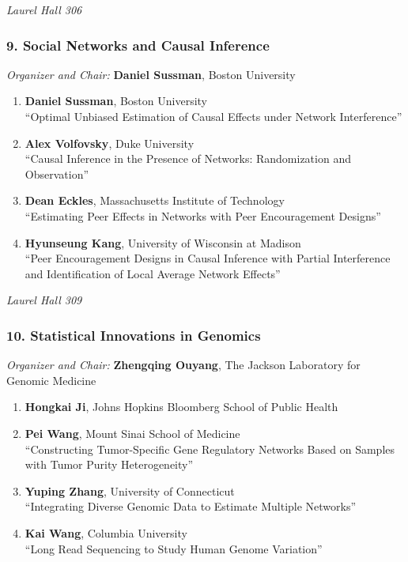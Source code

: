 \emph{Laurel Hall 306} \\[.5em]

\subsubsection*{9. Social Networks and Causal Inference}

\emph{Organizer and Chair:} \textbf{Daniel Sussman}, Boston University

\begin{enumerate}
\item \textbf{Daniel Sussman}, Boston University \\
``Optimal Unbiased Estimation of Causal Effects under Network Interference''
\item \textbf{Alex Volfovsky}, Duke University \\
``Causal Inference in the Presence of Networks: Randomization and Observation''
\item \textbf{Dean Eckles}, Massachusetts Institute of Technology \\
``Estimating Peer Effects in Networks with Peer Encouragement Designs''
\item \textbf{Hyunseung Kang}, University of Wisconsin at Madison \\
``Peer Encouragement Designs in Causal Inference with Partial Interference and Identification of Local Average Network Effects''
\end{enumerate}

\emph{Laurel Hall 309} \\[.5em]

\subsubsection*{10. Statistical Innovations in Genomics}

\emph{Organizer and Chair:} \textbf{Zhengqing Ouyang}, The Jackson Laboratory for Genomic Medicine

\begin{enumerate}
\item \textbf{Hongkai Ji}, Johns Hopkins Bloomberg School of Public Health 
\item \textbf{Pei Wang}, Mount Sinai School of Medicine \\
``Constructing Tumor-Specific Gene Regulatory Networks Based on Samples with Tumor Purity Heterogeneity''
\item \textbf{Yuping Zhang}, University of Connecticut \\
``Integrating Diverse Genomic Data to Estimate Multiple Networks''
\item \textbf{Kai Wang}, Columbia University \\
``Long Read Sequencing to Study Human Genome Variation''
\end{enumerate}

